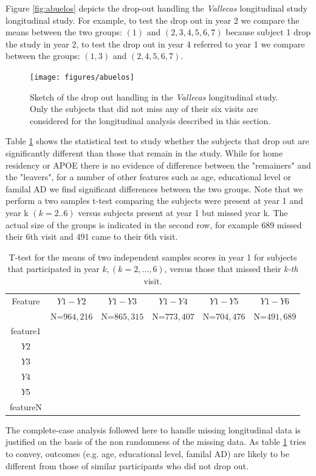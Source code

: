 \documentclass[11pt]{article}
\theoremstyle{definition}
\theoremstyle{remark}
\begin{document}
Figure \ref{fig:abuelos} depicts the drop-out handling the \emph{Vallecas} longitudinal study longitudinal study. For example, to test  the drop out in year 2 we compare the means between the two groups: $(1)$ and $(2,3,4,5,6,7)$ because subject 1 drop the study in year 2, to test the drop out in year 4 referred to year 1 we compare between the groups: $(1,3)$ and $(2,4,5,6,7)$. 
\begin{figure}[H]
        \centering
        \texttt{[image: figures/abuelos]}
        \caption{Sketch of the drop out handling in the \emph{Vallecas} longitudinal study. Only the subjects that did not miss any of their six visits are considered for the longitudinal analysis described in this section.} 
        \label{fig:tce}
\end{figure}

Table \ref{tab:testloyals} shows the statistical test to study whether the subjects that drop out are significantly different than those that remain in the study. While for home residency or APOE there is no evidence of difference between the "remainers" and the "leavers", for a number of other features such as age, educational level or familal AD we find significant differences between the two  groups. Note that we perform a two samples t-test comparing the subjects were present at year 1 and year k $(k=2..6)$ versus subjects present at year 1 but missed year k. The actual size of the groups is indicated in the second row, for example 689 missed their 6th visit and 491 came to their 6th visit. 

\begin{table}
  \centering
\begin{tabular}{cccccc} \toprule
    {Feature}   & {${Y1-Y2}$} & {${Y1-Y3}$} & {${Y1-Y4}$} & {${Y1-Y5}$} & {${Y1-Y6}$} \\ 
                & N={${964,216}$} & N={${865,315}$} & N={${773,407}$} & N={${704,476}$} & N={${491,689}$} \\  \midrule
    {feature1}  & & & & &  \\
    {${Y2}$}    & & & & &  \\ %
    {${Y3}$}    & & & & &  \\  
    {${Y4}$}    & & & & &  \\ 
    {${Y5}$}    & & & & &  \\
    {featureN}  & & & & &  \\ \bottomrule
\end{tabular}
\caption{T-test for the means of two independent samples scores in year 1 for subjects that participated in year $k, (k=2,...,6)$, versus those that missed their \emph{k-th} visit.}\label{tab:testloyals}
\end{table} 
The complete-case analysis followed here to handle missing longitudinal data is justified on the basis of the non randomness of the missing data. As table \ref{tab:testloyals} tries to convey, outcomes (e.g. age, educational level, familal AD) are likely to be different from those of similar participants who did not drop out. 
\end{document}
